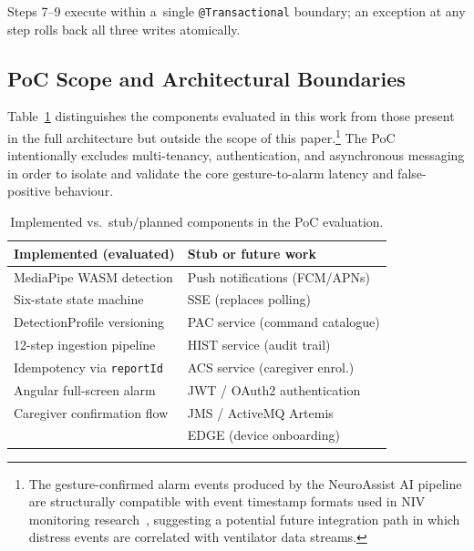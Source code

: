 Steps 7--9 execute within a~single \texttt{@Transactional} boundary; an exception at
any step rolls back all three writes atomically.

\subsection{PoC Scope and Architectural Boundaries}
\label{sec:scope}

Table~\ref{tab:scope} distinguishes the components evaluated in this work from those
present in the full architecture but outside the scope of this paper.\footnote{The gesture-confirmed alarm events produced by the NeuroAssist AI pipeline are structurally compatible with event timestamp formats used in NIV monitoring research~\cite{stell2024pva, yang2026pva}, suggesting a potential future integration path in which distress events are correlated with ventilator data streams.} The PoC
intentionally excludes multi-tenancy, authentication, and asynchronous messaging in
order to isolate and validate the core gesture-to-alarm latency and false-positive
behaviour.

\begin{table}[htbp]
\centering
\caption{Implemented vs.\ stub/planned components in the PoC evaluation.}
\label{tab:scope}
\begin{tabular}{p{3.2cm}p{4.6cm}}
\toprule
\textbf{Implemented (evaluated)} & \textbf{Stub or future work} \\
\midrule
MediaPipe WASM detection & Push notifications (FCM/APNs) \\
Six-state state machine & SSE (replaces polling) \\
DetectionProfile versioning & PAC service (command catalogue) \\
12-step ingestion pipeline & HIST service (audit trail) \\
Idempotency via \texttt{reportId} & ACS service (caregiver enrol.) \\
Angular full-screen alarm & JWT / OAuth2 authentication \\
Caregiver confirmation flow & JMS / ActiveMQ Artemis \\
                            & EDGE (device onboarding) \\
\bottomrule
\end{tabular}
\end{table}